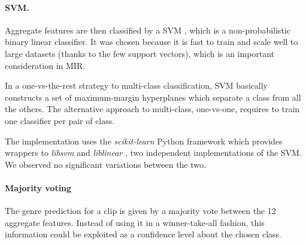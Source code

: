 \paragraph{\gls{SVM}.}
Aggregate features are then classified by a \gls{SVM} \cite{cortes1995SVM}, which is a non-probabilistic binary linear classifier. It was chosen because it is fast to train and scale well to large datasets (thanks to the few support vectors), which is an important consideration in \gls{MIR}.

In a one-vs-the-rest strategy to multi-class classification, \gls{SVM} basically constructs a set of maximum-margin hyperplanes which separate a class from all the others. The alternative approach to multi-class, one-vs-one, requires to train one classifier per pair of class.

The implementation uses the \textit{scikit-learn} Python framework \cite{sklearn} which provides wrappers to \textit{libsvm} \cite{libsvm} and \textit{liblinear} \cite{liblinear}, two independent implementations of the \gls{SVM}. We observed no significant variations between the two.

\paragraph{Majority voting}
The genre prediction for a clip is given by a majority vote between the 12 aggregate features. Instead of using it in a winner-take-all fashion, this information could be exploited as a confidence level about the chosen class.







